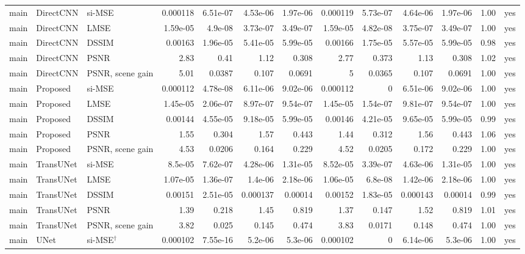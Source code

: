 \begin{table}[!htb]
{\begin{tabular}{lllrrrrrrrrrl}
\addlinespace
main & DirectCNN & si-MSE & 0.000118 & 6.51e-07 & 4.53e-06 & 1.97e-06 & 0.000119 & 5.73e-07 & 4.64e-06 & 1.97e-06 & 1.00 & yes \\
main & DirectCNN & LMSE & 1.59e-05 & 4.9e-08 & 3.73e-07 & 3.49e-07 & 1.59e-05 & 4.82e-08 & 3.75e-07 & 3.49e-07 & 1.00 & yes \\
main & DirectCNN & DSSIM & 0.00163 & 1.96e-05 & 5.41e-05 & 5.99e-05 & 0.00166 & 1.75e-05 & 5.57e-05 & 5.99e-05 & 0.98 & yes \\
main & DirectCNN & PSNR & 2.83 & 0.41 & 1.12 & 0.308 & 2.77 & 0.373 & 1.13 & 0.308 & 1.02 & yes \\
main & DirectCNN & PSNR, scene gain & 5.01 & 0.0387 & 0.107 & 0.0691 & 5 & 0.0365 & 0.107 & 0.0691 & 1.00 & yes \\
\addlinespace
main & Proposed & si-MSE & 0.000112 & 4.78e-08 & 6.11e-06 & 9.02e-06 & 0.000112 & 0 & 6.51e-06 & 9.02e-06 & 1.00 & yes \\
main & Proposed & LMSE & 1.45e-05 & 2.06e-07 & 8.97e-07 & 9.54e-07 & 1.45e-05 & 1.54e-07 & 9.81e-07 & 9.54e-07 & 1.00 & yes \\
main & Proposed & DSSIM & 0.00144 & 4.55e-05 & 9.18e-05 & 5.99e-05 & 0.00146 & 4.21e-05 & 9.65e-05 & 5.99e-05 & 0.99 & yes \\
main & Proposed & PSNR & 1.55 & 0.304 & 1.57 & 0.443 & 1.44 & 0.312 & 1.56 & 0.443 & 1.06 & yes \\
main & Proposed & PSNR, scene gain & 4.53 & 0.0206 & 0.164 & 0.229 & 4.52 & 0.0205 & 0.172 & 0.229 & 1.00 & yes \\
\addlinespace
main & TransUNet & si-MSE & 8.5e-05 & 7.62e-07 & 4.28e-06 & 1.31e-05 & 8.52e-05 & 3.39e-07 & 4.63e-06 & 1.31e-05 & 1.00 & yes \\
main & TransUNet & LMSE & 1.07e-05 & 1.36e-07 & 1.4e-06 & 2.18e-06 & 1.06e-05 & 6.8e-08 & 1.42e-06 & 2.18e-06 & 1.00 & yes \\
main & TransUNet & DSSIM & 0.00151 & 2.51e-05 & 0.000137 & 0.00014 & 0.00152 & 1.83e-05 & 0.000143 & 0.00014 & 0.99 & yes \\
main & TransUNet & PSNR & 1.39 & 0.218 & 1.45 & 0.819 & 1.37 & 0.147 & 1.52 & 0.819 & 1.01 & yes \\
main & TransUNet & PSNR, scene gain & 3.82 & 0.025 & 0.145 & 0.474 & 3.83 & 0.0171 & 0.148 & 0.474 & 1.00 & yes \\
\addlinespace
main & UNet & si-MSE$^\dagger$ & 0.000102 & 7.55e-16 & 5.2e-06 & 5.3e-06 & 0.000102 & 0 & 6.14e-06 & 5.3e-06 & 1.00 & yes \\

\end{tabular}}
\end{table}
